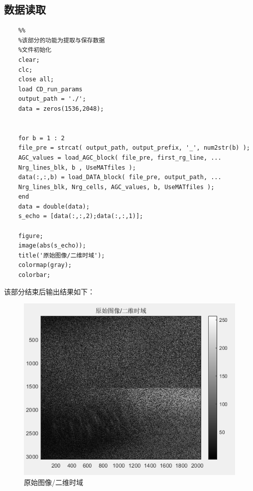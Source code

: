 \documentclass{article}
\begin{document}
\subsection{数据读取}
\begin{lstlisting}	
	%%
	%该部分的功能为提取与保存数据
	%文件初始化
	clear;
	clc;
	close all;
	load CD_run_params
	output_path = './';
	data = zeros(1536,2048);
	
	
	for b = 1 : 2
	file_pre = strcat( output_path, output_prefix, '_', num2str(b) );
	AGC_values = load_AGC_block( file_pre, first_rg_line, ...
	Nrg_lines_blk, b , UseMATfiles ); 
	data(:,:,b) = load_DATA_block( file_pre, output_path, ...
	Nrg_lines_blk, Nrg_cells, AGC_values, b, UseMATfiles );
	end
	data = double(data);
	s_echo = [data(:,:,2);data(:,:,1)];
	
	figure;
	image(abs(s_echo));
	title('原始图像/二维时域');
	colormap(gray);
	colorbar;
\end{lstlisting}
该部分结束后输出结果如下：

\begin{figure}[H] %
	\centering
	\includegraphics[scale=1]{4.png}
	\caption{原始图像/二维时域}
	\label{4}
\end{figure}
\end{document}
